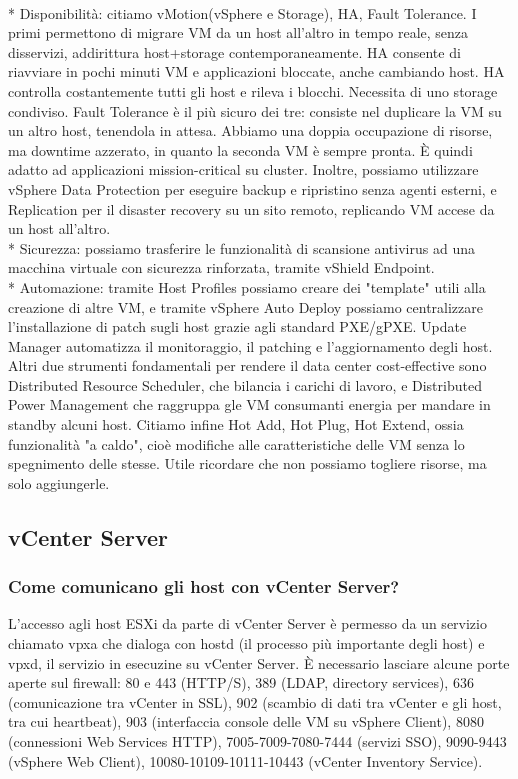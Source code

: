 \documentclass[11pt]{article}
\begin{document}
\\* Disponibilità: citiamo vMotion(vSphere e Storage), HA, Fault Tolerance. I primi permettono di migrare VM da un host all'altro in tempo reale, senza disservizi, addirittura host+storage contemporaneamente. HA consente di riavviare in pochi minuti VM e applicazioni bloccate, anche cambiando host. HA controlla costantemente tutti gli host e rileva i blocchi. Necessita di uno storage condiviso. Fault Tolerance è il più sicuro dei tre: consiste nel duplicare la VM su un altro host, tenendola in attesa. Abbiamo una doppia occupazione di risorse, ma downtime azzerato, in quanto la seconda VM è sempre pronta. È quindi adatto ad applicazioni mission-critical su cluster. Inoltre, possiamo utilizzare vSphere Data Protection per eseguire backup e ripristino senza agenti esterni, e Replication per il disaster recovery su un sito remoto, replicando VM accese da un host all'altro.
\\* Sicurezza: possiamo trasferire le funzionalità di scansione antivirus ad una macchina virtuale con sicurezza rinforzata, tramite vShield Endpoint.
\\* Automazione: tramite Host Profiles possiamo creare dei "template" utili alla creazione di altre VM, e tramite vSphere Auto Deploy possiamo centralizzare l'installazione di patch sugli host grazie agli standard PXE/gPXE. Update Manager automatizza il monitoraggio, il patching e l'aggiornamento degli host. Altri due strumenti fondamentali per rendere il data center cost-effective sono Distributed Resource Scheduler, che bilancia i carichi di lavoro, e Distributed Power Management che raggruppa gle VM consumanti energia per mandare in standby alcuni host. Citiamo infine Hot Add, Hot Plug, Hot Extend, ossia funzionalità "a caldo", cioè modifiche alle caratteristiche delle VM senza lo spegnimento delle stesse. Utile ricordare che non possiamo togliere risorse, ma solo aggiungerle.

\subsection{vCenter Server}
\subsubsection{Come comunicano gli host con vCenter Server?}
L'accesso agli host ESXi da parte di vCenter Server è permesso da un servizio chiamato vpxa che dialoga con hostd (il processo più importante degli host) e vpxd, il servizio in esecuzine su vCenter Server. È necessario lasciare alcune porte aperte sul firewall: 80 e 443 (HTTP/S), 389 (LDAP, directory services), 636 (comunicazione tra vCenter in SSL), 902 (scambio di dati tra vCenter e gli host, tra cui heartbeat), 903 (interfaccia console delle VM su vSphere Client), 8080 (connessioni Web Services HTTP), 7005-7009-7080-7444 (servizi SSO), 9090-9443 (vSphere Web Client), 10080-10109-10111-10443 (vCenter Inventory Service).
\end{document}
